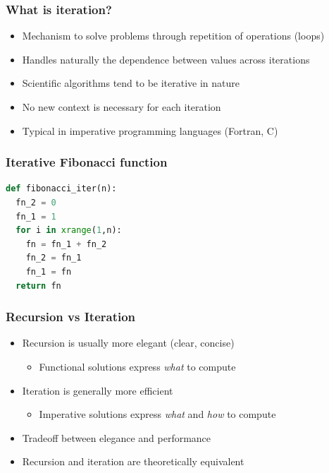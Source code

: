 \documentclass[xcolor=table,10pt,final]{beamer}
\begin{document}
\begin{frame}
	\frametitle{What is iteration?}
	\begin{itemize}
		\item Mechanism to solve problems through repetition of operations (loops)
		\item Handles naturally the dependence between values across iterations
		\item Scientific algorithms tend to be iterative in nature
		\item No new context is necessary for each iteration
		\item Typical in imperative programming languages (Fortran, C)
	\end{itemize}
\end{frame}

\begin{frame}[fragile]
	\frametitle{Iterative Fibonacci function}
	\begin{lstlisting}[language=Python]
def fibonacci_iter(n):
  fn_2 = 0
  fn_1 = 1
  for i in xrange(1,n):
    fn = fn_1 + fn_2
    fn_2 = fn_1
    fn_1 = fn
  return fn
	\end{lstlisting}
\end{frame}

\begin{frame}
	\frametitle{Recursion vs Iteration}
	\begin{itemize}
		\item Recursion is usually more elegant (clear, concise)
		\begin{itemize}
			\item Functional solutions express \emph{what} to compute
		\end{itemize}
		\item Iteration is generally more efficient
		\begin{itemize}
			\item Imperative solutions express \emph{what} and \emph{how} to compute
		\end{itemize}
		\item Tradeoff between elegance and performance
		\item Recursion and iteration are theoretically equivalent 
	\end{itemize}
\end{frame}
\end{document}
